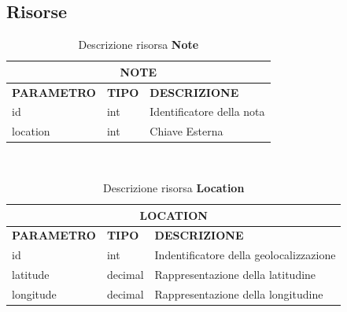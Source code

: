 \subsection{Risorse}

\begin{table}[!h]
\centering
	\begin{tabular}{@{}lll@{}}
		\toprule
		\multicolumn{3}{c}{{ \textbf{NOTE}}}                           \\ \midrule
		\textbf{PARAMETRO} & \textbf{TIPO} & \textbf{DESCRIZIONE}      \\ \midrule
		id                 & int           & Identificatore della nota \\ 
		location           & int           & Chiave Esterna            \\ \bottomrule
	\end{tabular}
\caption{Descrizione risorsa \textbf{Note}}\label{etichetta}
\end{table}

\ \linebreak
\begin{table}[!h]
\centering
	\begin{tabular}{@{}lll@{}}
		\toprule
		\multicolumn{3}{c}{\textbf{LOCATION}}                         \\ \midrule
		\textbf{PARAMETRO}&\textbf{TIPO}&\textbf{DESCRIZIONE}         \\ \midrule
		id        & int     & Indentificatore della geolocalizzazione \\ 
		latitude  & decimal & Rappresentazione della latitudine       \\ 
		longitude & decimal & Rappresentazione della longitudine      \\ \bottomrule
	\end{tabular}
\caption{Descrizione risorsa \textbf{Location}}\label{etichetta}
\end{table}

